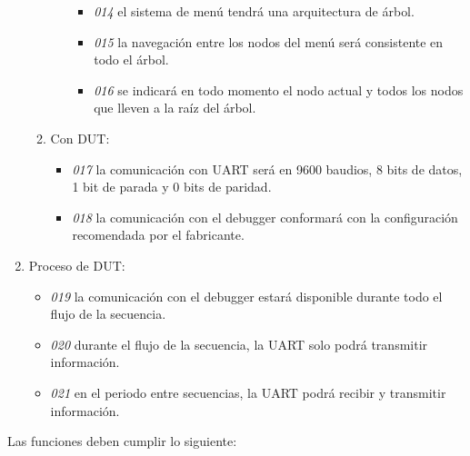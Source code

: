 \begin{enumerate}
\begin{enumerate}
\begin{itemize}
\begin{itemize}
							\item \emph{014} el sistema de menú tendrá una arquitectura de árbol.
							\item \emph{015} la navegación entre los nodos del menú será consistente en todo el árbol.
							\item \emph{016} se indicará en todo momento el nodo actual y todos los nodos que lleven a la raíz del árbol.
						\end{itemize}
				\end{itemize}
			\item Con DUT:
				\begin{itemize}
					\item \emph{017} la comunicación con UART será en 9600 baudios, 8 bits de datos, 1 bit de parada y 0 bits de paridad.
					\item \emph{018} la comunicación con el debugger conformará con la configuración recomendada por el fabricante.
				\end{itemize}
		\end{enumerate}
	\item Proceso de DUT:
		\begin{itemize}
			\item \emph{019} la comunicación con el debugger estará disponible durante todo el flujo de la secuencia.
			\item \emph{020} durante el flujo de la secuencia, la UART solo podrá transmitir información.
			\item \emph{021} en el periodo entre secuencias, la UART podrá recibir y transmitir información.
		\end{itemize}
\end{enumerate}

Las funciones deben cumplir lo siguiente:

